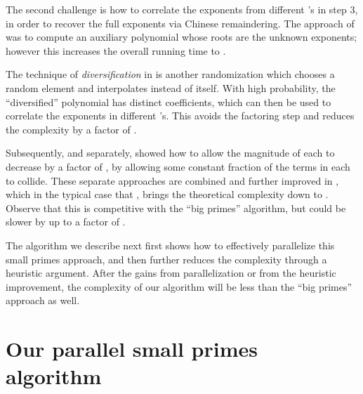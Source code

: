 \documentclass[letterpaper,10pt]{article}
\def\cite{\citep}
\begin{document}
The second challenge is how to correlate the exponents from different
's in step 3, in order to recover the full exponents via Chinese
remaindering. The approach of \cite{GS09} was to compute an auxiliary
polynomial whose roots are the unknown exponents; however this
increases the overall running time to .

The technique of \emph{diversification} in \cite{GR11a} is another
randomization which chooses a random element  and interpolates
 instead of  itself. With high probability, the
``diversified'' polynomial  has distinct coefficients,
which can then be used to correlate the exponents in different 's.
This avoids the factoring step and reduces the complexity by a factor of
.

Subsequently, and separately, \cite{AGR13} showed how to allow the
magnitude of each  to decrease by a factor of , by allowing some
constant fraction of the terms in each  to collide. These separate
approaches are combined and further improved in \cite{AGR15},
which in the typical case that
, brings the theoretical complexity down to
. Observe that this is competitive with the
``big primes'' algorithm, but could be slower by up to a factor of
. 

The algorithm we describe next first shows how to effectively
parallelize this small primes approach, and then further reduces the
complexity through a heuristic argument. After the gains from
parallelization or from the heuristic improvement, the complexity of our
algorithm will be less than the ``big primes'' approach as well.

\section{Our parallel small primes algorithm}
\label{sec:ouralg}
\end{document}
